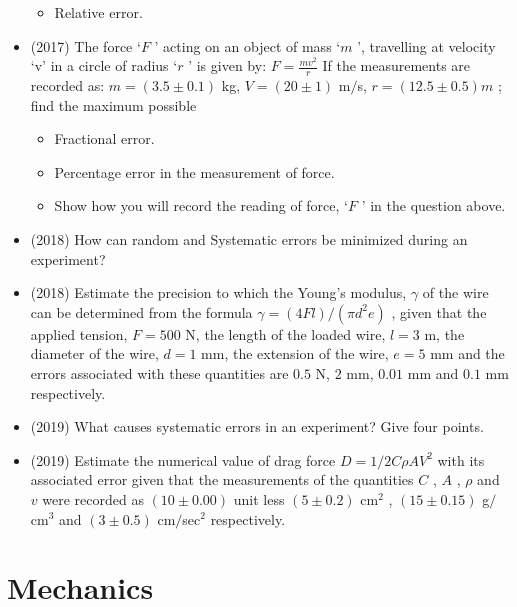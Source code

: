 \documentclass{article}
\begin{document}
\begin{itemize}
\begin{itemize}
\item Relative error. 
\end{itemize}
\item (2017)  The force ‘$ F$ ’ acting on an object of mass ‘$ m$ ’, travelling at velocity ‘v’ in a circle of radius ‘$ r$ ’ is given by: $ F= \frac{mv^{2}}{r}$ If the measurements are recorded as: $ m=(3.5 \pm 0.1)$ kg, $ V=(20\pm 1)$ m$/$s, $ r=(12.5\pm 0.5)m$ ; find the maximum possible\begin{itemize}
\item Fractional error. 
\item Percentage error in the measurement of force.
\item Show how you will record the reading of force, ‘$ F$ ’ in the question above. 
\end{itemize}
\item (2018)  How can random and Systematic errors be minimized during an experiment?
\item (2018)  Estimate the precision to which the Young’s modulus, $ \gamma $ of the wire can be determined from the formula $ \gamma =(4Fl)/(\pi d^{2} e)$ , given that the applied tension, $ F=500$ N, the length of the loaded wire,  $ l=3$ m, the diameter of the wire, $ d=1$ mm, the extension of the wire, $ e=5$ mm and the errors associated with these quantities are $ 0.5$ N, $ 2$ mm, $ 0.01$ mm and $ 0.1$ mm respectively. 
\item (2019)  What causes systematic errors in an experiment? Give four points. 
\item (2019)  Estimate the numerical value of drag force $ D= 1/2 C \rho  A V^{2}$ with its associated error given that the measurements of the quantities $ C$ , $ A$ , $ \rho $ and $ v$ were recorded as $ (10\pm 0.00)$ unit less $ (5\pm 0.2) $ cm$ ^{2}$ , $ (15\pm 0.15)$ g$/$cm$ ^{3}$ and $ (3\pm 0.5)$ cm$/$sec$ ^{2}$ respectively. 
\end{itemize}


\section{Mechanics}
\end{document}
